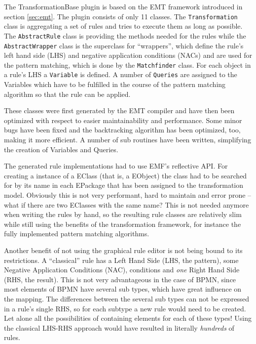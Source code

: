 The TransformationBase plugin is based on the EMT framework introduced in section \ref{sec:emt}.
The plugin consists of only 11 classes. The \verb|Transformation| class is aggregating a set of rules and tries to execute them as long as possible. The \verb|AbstractRule| class is providing the methods needed for the rules while the \verb|AbstractWrapper| class is the superclass for ``wrappers'', which define the rule's left hand side (LHS) and negative application conditions (NACs) and are used for the pattern matching, which is done by the \verb|Matchfinder| class. For each object in a rule's LHS a \verb|Variable| is defined. A number of \verb|Queries| are assigned to the Variables which have to be fulfilled in the course of the pattern matching algorithm so that the rule can be applied.

These classes were first generated by the EMT compiler and have then been optimized with respect to easier maintainability and performance. Some minor bugs have been fixed and the backtracking algorithm has been optimized, too, making it more efficient. A number of sub routines have been written, simplifying the creation of Variables and Queries.

The generated rule implementations had to use EMF's reflective API. For creating a instance of a EClass (that is, a EObject) the class had to be searched for by its name in each EPackage that has been assigned to the transformation model. Obviously this is not very performant, hard to maintain and error prone -- what if there are two EClasses with the same name? This is not needed anymore when writing the rules by hand, so the resulting rule classes are relatively slim while still using the benefits of the transformation framework, for instance the fully implemented pattern matching algorithms.

Another benefit of not using the graphical rule editor is not being bound to its restrictions. A ``classical'' rule has a Left Hand Side (LHS, the pattern), some Negative Application Conditions (NAC), conditions and \emph{one} Right Hand Side (RHS, the result). This is not very advantageous in the case of BPMN, since most elements of BPMN have several sub types, which have great influence on the mapping. The differences between the several sub types can not be expressed in a rule's single RHS, so for each subtype a new rule would need to be created. Let alone all the possibilities of containing elements for each of these types! Using the classical LHS-RHS approach would have resulted in literally \emph{hundreds} of rules.

